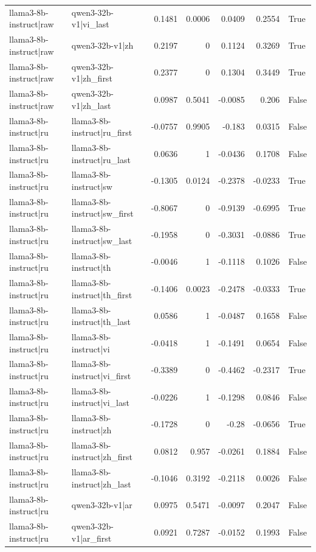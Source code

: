 \begin{table}
\begin{tabular}{l l r r r r l}
llama3-8b-instruct|raw & qwen3-32b-v1|vi_last & 0.1481 & 0.0006 & 0.0409 & 0.2554 & True \\
llama3-8b-instruct|raw & qwen3-32b-v1|zh & 0.2197 & 0 & 0.1124 & 0.3269 & True \\
llama3-8b-instruct|raw & qwen3-32b-v1|zh_first & 0.2377 & 0 & 0.1304 & 0.3449 & True \\
llama3-8b-instruct|raw & qwen3-32b-v1|zh_last & 0.0987 & 0.5041 & -0.0085 & 0.206 & False \\
llama3-8b-instruct|ru & llama3-8b-instruct|ru_first & -0.0757 & 0.9905 & -0.183 & 0.0315 & False \\
llama3-8b-instruct|ru & llama3-8b-instruct|ru_last & 0.0636 & 1 & -0.0436 & 0.1708 & False \\
llama3-8b-instruct|ru & llama3-8b-instruct|sw & -0.1305 & 0.0124 & -0.2378 & -0.0233 & True \\
llama3-8b-instruct|ru & llama3-8b-instruct|sw_first & -0.8067 & 0 & -0.9139 & -0.6995 & True \\
llama3-8b-instruct|ru & llama3-8b-instruct|sw_last & -0.1958 & 0 & -0.3031 & -0.0886 & True \\
llama3-8b-instruct|ru & llama3-8b-instruct|th & -0.0046 & 1 & -0.1118 & 0.1026 & False \\
llama3-8b-instruct|ru & llama3-8b-instruct|th_first & -0.1406 & 0.0023 & -0.2478 & -0.0333 & True \\
llama3-8b-instruct|ru & llama3-8b-instruct|th_last & 0.0586 & 1 & -0.0487 & 0.1658 & False \\
llama3-8b-instruct|ru & llama3-8b-instruct|vi & -0.0418 & 1 & -0.1491 & 0.0654 & False \\
llama3-8b-instruct|ru & llama3-8b-instruct|vi_first & -0.3389 & 0 & -0.4462 & -0.2317 & True \\
llama3-8b-instruct|ru & llama3-8b-instruct|vi_last & -0.0226 & 1 & -0.1298 & 0.0846 & False \\
llama3-8b-instruct|ru & llama3-8b-instruct|zh & -0.1728 & 0 & -0.28 & -0.0656 & True \\
llama3-8b-instruct|ru & llama3-8b-instruct|zh_first & 0.0812 & 0.957 & -0.0261 & 0.1884 & False \\
llama3-8b-instruct|ru & llama3-8b-instruct|zh_last & -0.1046 & 0.3192 & -0.2118 & 0.0026 & False \\
llama3-8b-instruct|ru & qwen3-32b-v1|ar & 0.0975 & 0.5471 & -0.0097 & 0.2047 & False \\
llama3-8b-instruct|ru & qwen3-32b-v1|ar_first & 0.0921 & 0.7287 & -0.0152 & 0.1993 & False \\

\end{tabular}
\end{table}
